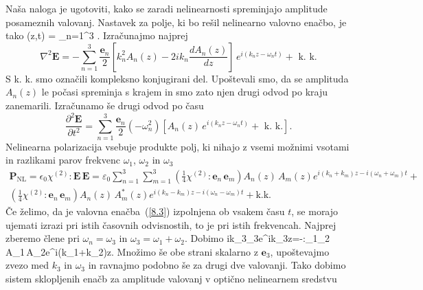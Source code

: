 Naša naloga
je ugotoviti, kako se zaradi nelinearnosti spreminjajo amplitude posameznih valovanj.
Nastavek za polje, ki bo rešil nelinearno valovno enačbo, je tako
\beq
{}(z,t) = \sum_{n=1}^3 .
\label{eq:nlnastavek}
\eeq
Izračunajmo najprej 
\begin{equation}
\nabla^{2}\mathbf{E}=-\sum_{n=1}^3 \frac{\mathbf{e}_{n}}{2}\left[k_{n}^{2}A_{n}(z)-2ik_{n}
\frac{dA_{n}(z)}{dz}\right]\, e^{i(k_{n}z-\omega_{n}t)}+\mbox{ k. k.}
\label{8.5}
\end{equation}
S k. k. smo označili kompleksno konjugirani del. Upoštevali smo,
da se amplituda $A_{n}(z)$ le počasi spreminja s krajem in smo zato njen
drugi odvod po kraju zanemarili.
Izračunamo še drugi odvod po času 
\begin{equation}
\frac{\partial^2\mathbf{E}}{\partial t^2}=\sum_{n=1}^3 \frac{\mathbf{e}_{n}}{2}
\left(-\omega_n^2\right) \left[A_{n}(z)\, e^{i(k_{n}z-\omega_{n}t)}+\mbox{ k. k.}\right].
\label{8.5a}
\end{equation}
Nelinearna polarizacija vsebuje produkte polj, ki nihajo z vsemi možnimi
vsotami in razlikami parov frekvenc $\omega_{1}$, $\omega_{2}$ in
$\omega_{3}$
\begin{multline}
\mathbf{P}_{\mathrm{NL}}= \epsilon_{0}\chi^{(2)}:\mathbf{E}\, \mathbf{E} =
\varepsilon_0 \sum_{n=1}^3 \sum_{m=1}^3 
 \left( \frac{1}{4} \chi^{(2)}:\mathbf{e}_{n}\,\mathbf{e}_{m}\right) 
 A_{n}(z)\,A_{m}(z) e^{i(k_{n}+k_{m})z-i(\omega_{n}+\omega_{m})t}+  \\
\left( \frac{1}{4} \chi^{(2)}:\mathbf{e}_{n}\,\mathbf{e}_{m}\right)
A_{n}(z)\,A_{m}^*(z) e^{i(k_{n}-k_{m})z-i(\omega_{n}-\omega_{m})t}+ \mathrm{k. k.}
\label{8.5b}
\end{multline}
Če želimo, da je valovna enačba~(\ref{8.3}) izpolnjena ob vsakem času $t$, se morajo
ujemati izrazi pri istih časovnih odvisnostih, to je pri istih frekvencah. Najprej 
zberemo člene pri $\omega_n = \omega_3$ in $\omega_3 = \omega_1 + \omega_2$. Dobimo
\beq
ik_{3}_{3}e^{ik_{3}z}=-\chi:_{1}_{2}\,A_{1}\,A_{2}e^{i(k_{1}+k_{2})z}.
\label{8.7}
\eeq
Množimo še obe strani skalarno z $\mathbf{e}_{3}$, upoštevajmo zvezo med $k_{3}$ in $\omega_{3}$
in ravnajmo podobno še za drugi dve valovanji. Tako dobimo sistem sklopljenih
enačb za amplitude valovanj v optično nelinearnem sredstvu
